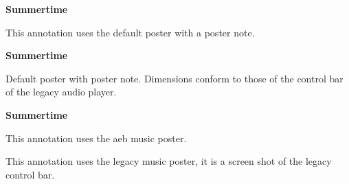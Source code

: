 \documentclass{article}
\begin{document}
\maketitle

\null\vfil

\begin{center}
{\Large\bfseries\color{blue}Summertime}\\[2ex]
\end{center}

This annotation uses the default poster with a poster note.


\begin{center}
{\Large\bfseries\color{blue}Summertime}\\[2ex]
\end{center}

Default poster with poster note. Dimensions conform to those of the control bar of the legacy
audio player.

\newpage

\begin{center}
{\Large\bfseries\color{blue}Summertime}\\[2ex]
\end{center}

This annotation uses the aeb music poster.

\begin{center}
\end{center}

This annotation uses the legacy music poster, it is a screen shot of
the legacy control bar.
\end{document}
